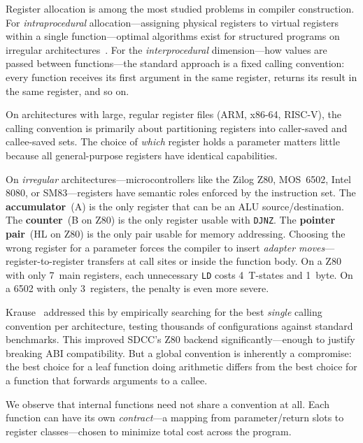 \documentclass[sigplan,screen,nonacm]{acmart}
\begin{document}
Register allocation is among the most studied problems in compiler
construction.  For \emph{intraprocedural} allocation---assigning physical
registers to virtual registers within a single function---optimal algorithms
exist for structured programs on irregular architectures~\cite{krause2013}.
For the \emph{interprocedural} dimension---how values are passed between
functions---the standard approach is a fixed calling convention: every
function receives its first argument in the same register, returns its
result in the same register, and so on.

On architectures with large, regular register files (ARM, x86-64, RISC-V),
the calling convention is primarily about partitioning registers into
caller-saved and callee-saved sets.  The choice of \emph{which} register
holds a parameter matters little because all general-purpose registers have
identical capabilities.

On \emph{irregular} architectures---microcontrollers like the Zilog Z80,
MOS~6502, Intel 8080, or SM83---registers have semantic roles enforced by
the instruction set.  The \textbf{accumulator}~(A) is the only register
that can be an ALU source/destination.  The \textbf{counter}~(B on Z80) is
the only register usable with \texttt{DJNZ}.  The \textbf{pointer pair}~(HL
on Z80) is the only pair usable for memory addressing.  Choosing the wrong
register for a parameter forces the compiler to insert \emph{adapter
moves}---register-to-register transfers at call sites or inside the function
body.  On a Z80 with only 7~main registers, each unnecessary \texttt{LD}
costs 4~T-states and 1~byte.  On a 6502 with only 3~registers, the penalty
is even more severe.

Krause~\cite{krause2022} addressed this by empirically searching for the
best \emph{single} calling convention per architecture, testing thousands of
configurations against standard benchmarks.  This improved SDCC's Z80
backend significantly---enough to justify breaking ABI compatibility.  But a
global convention is inherently a compromise: the best choice for a leaf
function doing arithmetic differs from the best choice for a function that
forwards arguments to a callee.

We observe that internal functions need not share a convention at all.  Each
function can have its own \emph{contract}---a mapping from parameter/return
slots to register classes---chosen to minimize total cost across the
program.
\end{document}
